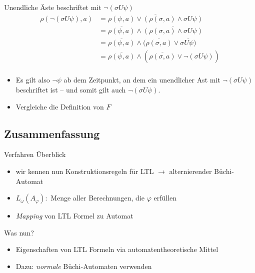 \begin{frame}{\insertsubsection}
    \begin{block}{Unendliche Äste beschriftet mit $\lnot(\sigma U\psi)$}
        \begin{equation*}
        \begin{split}
            \rho(\lnot(\sigma U\psi), a) &= \overline{\rho(\psi, a) \lor (\rho(\sigma, a) \land \sigma U\psi)}\\
            &= \overline{\rho(\psi, a)} \land \overline{(\rho(\sigma, a) \land \sigma U\psi)}\\
            &= \overline{\rho(\psi, a)} \land (\overline{\rho(\sigma, a)} \lor \overline{\sigma U\psi)}\\
            &= \overline{\rho(\psi, a)} \land (\overline{\rho(\sigma, a)} \lor \lnot(\sigma U\psi))\\
        \end{split}
        \end{equation*}
    \end{block}
    \pause
    \begin{itemize}
    \setlength\itemsep{1em}
        \item Es gilt also $\lnot\psi$ ab dem Zeitpunkt, an dem ein unendlicher Ast mit $\lnot(\sigma U\psi)$ beschriftet ist -- und somit gilt auch $\lnot(\sigma U\psi)$.
        \item Vergleiche die Definition von $F$ 
    \end{itemize}
\end{frame}

\subsection{Zusammenfassung}
\begin{frame}{\insertsubsection}
    \begin{block}{Verfahren Überblick}
        \begin{itemize}
            \setlength\itemsep{0.7em}
            \item wir kennen nun Konstruktionsregeln für LTL $\rightarrow$ alternierender Büchi-Automat
            \item $L_\omega(A_\varphi):$ Menge aller Berechnungen, die $\varphi$ erfüllen
            \item \textit{Mapping} von LTL Formel zu Automat
        \end{itemize}
    \end{block}
    \pause
    \begin{block}{Was nun?}
        \begin{itemize}
            \setlength\itemsep{0.7em}
            \item Eigenschaften von LTL Formeln via automatentheoretische Mittel
            \item Dazu: \textit{normale} Büchi-Automaten verwenden
        \end{itemize}
    \end{block}
\end{frame}